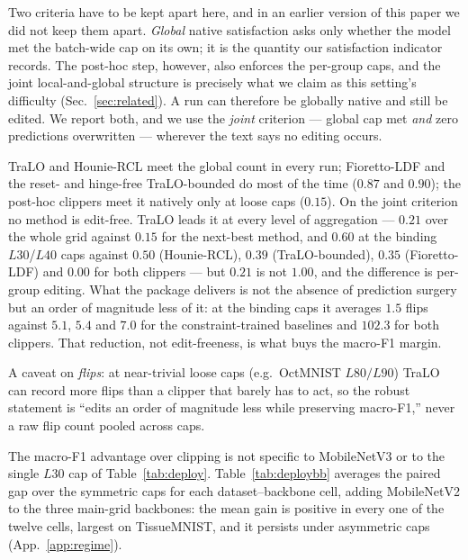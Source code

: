 \documentclass[10pt]{article}
\begin{document}
{Two criteria have to be kept apart here, and in an earlier version of
this paper we did not keep them apart. \emph{Global} native satisfaction asks
only whether the model met the batch-wide cap on its own; it is the quantity our
satisfaction indicator records. The post-hoc step, however, also enforces the
per-group caps, and the joint local-and-global structure is precisely what we
claim as this setting's difficulty (Sec.~\ref{sec:related}). A run can therefore
be globally native and still be edited. We report both, and we use the
\emph{joint} criterion --- global cap met \emph{and} zero predictions
overwritten --- wherever the text says no editing occurs.}

TraLO and Hounie-RCL meet the {global} count in every run;
Fioretto-LDF and {the reset- and hinge-free}
TraLO-bounded do most of the time ($0.87$ and $0.90$); the
post-hoc clippers meet it natively only at loose caps
{($0.15$)}.
{On the joint criterion no method is edit-free. TraLO leads it at
every level of aggregation --- $0.21$ over the whole grid against $0.15$ for the
next-best method, and $0.60$ at the binding $L30$/$L40$ caps against $0.50$
(Hounie-RCL), $0.39$ (TraLO-bounded), $0.35$ (Fioretto-LDF) and $0.00$ for both
clippers --- but $0.21$ is not $1.00$, and the difference is per-group editing.
What the package delivers is not the absence of prediction surgery but an order
of magnitude less of it: at the binding caps it averages $1.5$ flips against
$5.1$, $5.4$ and $7.0$ for the constraint-trained baselines and $102.3$ for both
clippers. That reduction, not edit-freeness, is what buys the macro-F1 margin.}

A caveat on
\emph{flips}: at near-trivial loose caps (e.g.\ OctMNIST $L80/L90$)
TraLO can record more flips than a clipper that barely has to act, so
the robust statement is {``edits an order of magnitude less while preserving
macro-F1,''} never a raw flip count
{pooled across caps}.

The macro-F1 advantage over clipping is not specific to MobileNetV3 or
to the single $L30$ cap of Table~\ref{tab:deploy}.
Table~\ref{tab:deploybb} averages the paired gap over the symmetric caps
for each dataset--backbone cell, adding MobileNetV2 to the three
main-grid backbones: the mean gain is positive in every one of the
twelve cells, largest on TissueMNIST, and it persists under asymmetric
caps (App.~\ref{app:regime}).


\end{document}
